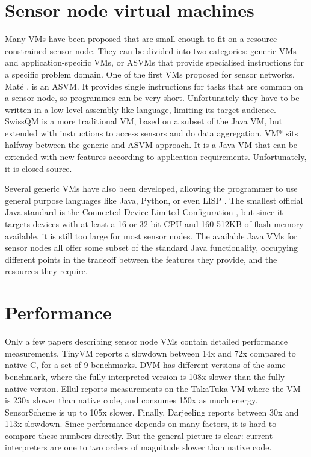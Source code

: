 \section{Sensor node virtual machines}
Many VMs have been proposed that are small enough to fit on a resource-constrained sensor node. They can be divided into two categories: generic VMs and application-specific VMs, or ASVMs \cite{Culler05} that provide specialised instructions for a specific problem domain. One of the first VMs proposed for sensor networks, Mat\'e \cite{Levis:2002ku}, is an ASVM. It provides single instructions for tasks that are common on a sensor node, so programmes can be very short. Unfortunately they have to be written in a low-level assembly-like language, limiting its target audience. SwissQM \cite{Muller:2007fs} is a more traditional VM, based on a subset of the Java VM, but extended with instructions to access sensors and do data aggregation. VM* \cite{Koshy:2005ww} sits halfway between the generic and ASVM approach. It is a Java VM that can be extended with new features according to application requirements. Unfortunately, it is closed source.

Several generic VMs have also been developed, allowing the programmer to use general purpose languages like Java, Python, or even LISP \cite{Harbaum, Brouwers:2009cj, Aslam:2008, Evers:2010ur}. The smallest official Java standard is the Connected Device Limited Configuration \cite{CLDC}, but since it targets devices with at least a 16 or 32-bit CPU and 160-512KB of flash memory available, it is still too large for most sensor nodes. The available Java VMs for sensor nodes all offer some subset of the standard Java functionality, occupying different points in the tradeoff between the features they provide, and the resources they require.



\section{Performance}
Only a few papers describing sensor node VMs contain detailed performance measurements. TinyVM \cite{Hong:2009gc} reports a slowdown between 14x and 72x compared to native C, for a set of 9 benchmarks. DVM \cite{Balani:2006} has different versions of the same benchmark, where the fully interpreted version is 108x slower than the fully native version. Ellul reports measurements on the TakaTuka VM \cite{Aslam:2008, Ellul:2012thesis} where the VM is 230x slower than native code, and consumes 150x as much energy. SensorScheme \cite{Evers:2010ur} is up to 105x slower. Finally, Darjeeling \cite{Brouwers:2009cj} reports between 30x and 113x slowdown. Since performance depends on many factors, it is hard to compare these numbers directly. But the general picture is clear: current interpreters are one to two orders of magnitude slower than native code.

